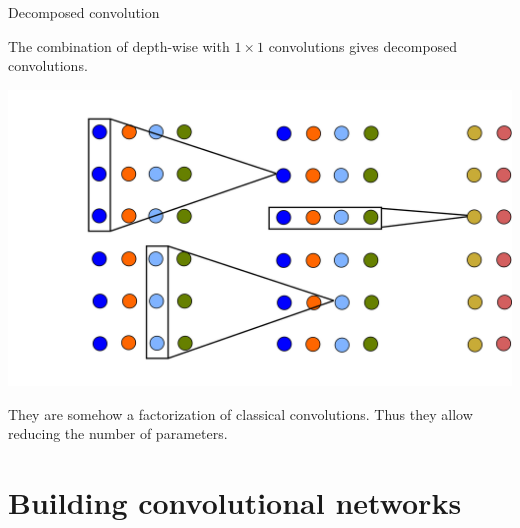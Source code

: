 \documentclass[xcolor=pdftex,dvipsnames,table,mathserif]{beamer}
\begin{document}
\begin{frame}{Decomposed convolution}

  The combination of depth-wise with $1 \times 1$ convolutions gives decomposed convolutions.

  \begin{center}
    \includegraphics[height=0.66\textheight]{conv_dec.png}
  \end{center}

  They are somehow a factorization of classical convolutions. Thus they allow reducing the number of parameters.

\end{frame}



\section{Building convolutional networks}

\end{document}
